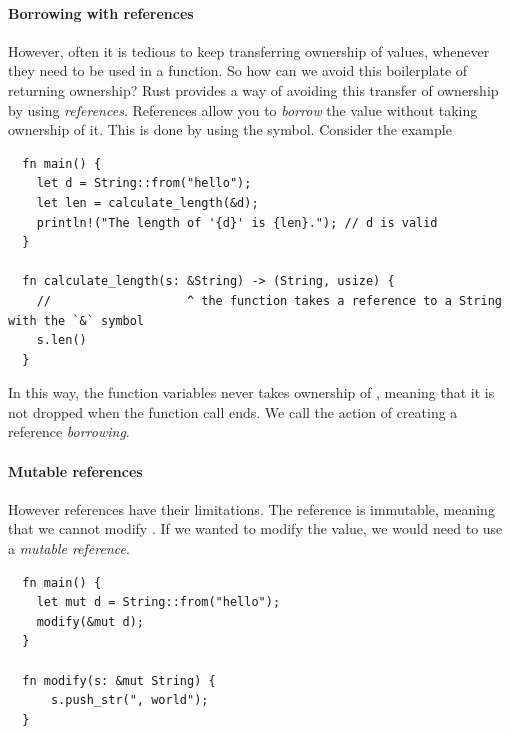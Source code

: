 \documentclass[11pt]{report}
\theoremstyle{definition}
\theoremstyle{plain}
\begin{document}
\paragraph{Borrowing with references}
However, often it is tedious to keep transferring ownership of values, whenever they need to be used in a function. So how can we avoid this boilerplate of returning ownership? Rust provides a way of avoiding this transfer of ownership by using \textit{references}. References allow you to \textit{borrow} the value without taking ownership of it. This is done by using the \rust{&} symbol. Consider the example
\begin{verbatim}
  fn main() {
    let d = String::from("hello");
    let len = calculate_length(&d);
    println!("The length of '{d}' is {len}."); // d is valid
  }

  fn calculate_length(s: &String) -> (String, usize) {
    //                   ^ the function takes a reference to a String with the `&` symbol
    s.len()
  }
\end{verbatim}

In this way, the function variables  never takes ownership of , meaning that it is not dropped when the function call ends. We call the action of creating a reference \textit{borrowing}.

\paragraph{Mutable references}
However references have their limitations. The reference is immutable, meaning that we cannot modify . If we wanted to modify the value, we would need to use a \textit{mutable reference}.

\begin{verbatim}
  fn main() {
    let mut d = String::from("hello");
    modify(&mut d);
  }
  
  fn modify(s: &mut String) {
      s.push_str(", world");
  }
 \end{verbatim}
\end{document}
